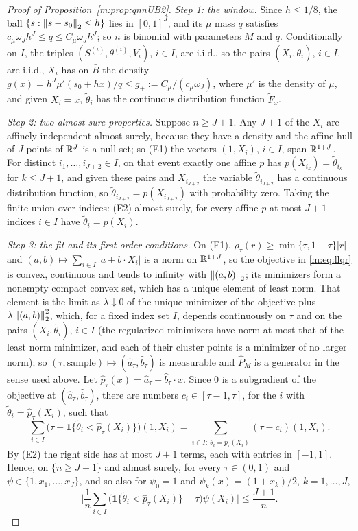 \begin{proof}[Proof of Proposition~\ref{m:prop:qnnUB2}]
\emph{Step 1: the window.} Since $h\le1/8$, the ball $\{s:\left\|s-s_0\right\|_2\le h\}$ lies in $[0,1]^J$, and its $\mu$ mass $q$ satisfies $c_\mu\omega_Jh^J\le q\le C_\mu\omega_Jh^J$; so $n$ is binomial with parameters $M$ and $q$. Conditionally on $I$, the triples $(S^{(i)},\theta^{(i)},V_i)$, $i\in I$, are i.i.d., so the pairs $(X_i,\tilde\theta_i)$, $i\in I$, are i.i.d., $X_i$ has on $\bar B$ the density $g(x)=h^J\mu'(s_0+hx)/q\le g_+:=C_\mu/(c_\mu\omega_J)$, where $\mu'$ is the density of $\mu$, and given $X_i=x$, $\tilde\theta_i$ has the continuous distribution function $\tilde F_x$.

\emph{Step 2: two almost sure properties.} Suppose $n\ge J+1$. Any $J+1$ of the $X_i$ are affinely independent almost surely, because they have a density and the affine hull of $J$ points of $\mathbb{R}^J$ is a null set; so (E1) the vectors $(1,X_i)$, $i\in I$, span $\mathbb{R}^{1+J}$. For distinct $i_1,\dots,i_{J+2}\in I$, on that event exactly one affine $p$ has $p(X_{i_k})=\tilde\theta_{i_k}$ for $k\le J+1$, and given these pairs and $X_{i_{J+2}}$ the variable $\tilde\theta_{i_{J+2}}$ has a continuous distribution function, so $\tilde\theta_{i_{J+2}}=p(X_{i_{J+2}})$ with probability zero. Taking the finite union over indices: (E2) almost surely, for every affine $p$ at most $J+1$ indices $i\in I$ have $\tilde\theta_i=p(X_i)$.

\emph{Step 3: the fit and its first order conditions.} On (E1), $\rho_\tau(r)\ge\min\{\tau,1-\tau\}|r|$ and $(a,b)\mapsto\sum_{i\in I}|a+b\cdot X_i|$ is a norm on $\mathbb{R}^{1+J}$, so the objective in \eqref{m:eq:llqr} is convex, continuous and tends to infinity with $\left\|(a,b)\right\|_2$; its minimizers form a nonempty compact convex set, which has a unique element of least norm. That element is the limit as $\lambda\downarrow0$ of the unique minimizer of the objective plus $\lambda\left\|(a,b)\right\|_2^2$, which, for a fixed index set $I$, depends continuously on $\tau$ and on the pairs $(X_i,\tilde\theta_i)$, $i\in I$ (the regularized minimizers have norm at most that of the least norm minimizer, and each of their cluster points is a minimizer of no larger norm); so $(\tau,\text{sample})\mapsto(\hat a_\tau,\hat b_\tau)$ is measurable and $\hat P_M$ is a generator in the sense used above. Let $\hat p_\tau(x)=\hat a_\tau+\hat b_\tau\cdot x$. Since $0$ is a subgradient of the objective at $(\hat a_\tau,\hat b_\tau)$, there are numbers $c_i\in[\tau-1,\tau]$, for the $i$ with $\tilde\theta_i=\hat p_\tau(X_i)$, such that
\[
\sum_{i\in I}\big(\tau-\mathbf 1\{\tilde\theta_i<\hat p_\tau(X_i)\}\big)(1,X_i)=\sum_{i\in I:\ \tilde\theta_i=\hat p_\tau(X_i)}(\tau-c_i)(1,X_i).
\]
By (E2) the right side has at most $J+1$ terms, each with entries in $[-1,1]$. Hence, on $\{n\ge J+1\}$ and almost surely, for every $\tau\in(0,1)$ and $\psi\in\{1,x_1,\dots,x_J\}$, and so also for $\psi_0=1$ and $\psi_k(x)=(1+x_k)/2$, $k=1,\dots,J$,
\begin{equation}\label{m:eq:qkkt}
\Big|\frac1n\sum_{i\in I}\big(\mathbf 1\{\tilde\theta_i<\hat p_\tau(X_i)\}-\tau\big)\psi(X_i)\Big|\le\frac{J+1}n .
\end{equation}


\end{proof}
